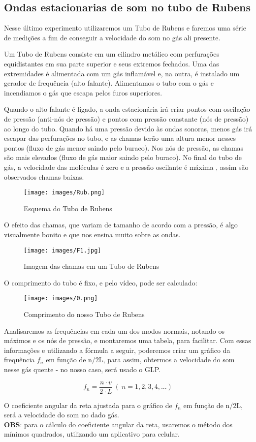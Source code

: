 \subsection{Ondas estacionarias de som no tubo de Rubens}

Nesse último experimento utilizaremos um Tubo de Rubens e faremos uma série de medições a fim de conseguir a velocidade do som no gás ali presente.

Um Tubo de Rubens consiste em um cilindro metálico com perfurações equidistantes em sua parte superior e seus extremos fechados. Uma das extremidades é alimentada com um gás inflamável e, na outra, é instalado um gerador de frequência (alto falante).
Alimentamos o tubo com o gás e incendiamos o gás que escapa pelos furos superiores. 

Quando o alto-falante é ligado, a onda estacionária irá criar pontos com oscilação de pressão (anti-nós de pressão) e pontos com pressão constante (nós de pressão) ao longo do tubo. Quando há uma pressão devido às ondas sonoras, menos gás irá escapar das perfurações no tubo, e as chamas terão uma altura menor nesses pontos (fluxo de gás menor saindo pelo buraco). Nos nós de pressão, as chamas são mais elevados (fluxo de gás maior saindo pelo buraco). No final do tubo de gás, a velocidade das moléculas é zero e a pressão oscilante é máxima , assim são observados chamas baixas.
\begin{figure}[H]
  \centering
  \texttt{[image: images/Rub.png]}
  \caption{Esquema do Tubo de Rubens}
\end{figure}    

O efeito das chamas, que variam de tamanho de acordo com a pressão, é algo visualmente bonito e que nos ensina muito sobre as ondas.

\begin{figure}[H]
  \centering
  \texttt{[image: images/F1.jpg]}
  \caption{Imagem das chamas em um Tubo de Rubens}
\end{figure}

O comprimento do tubo é fixo, e pelo vídeo, pode ser calculado:

\begin{figure}[H]
  \centering
  \texttt{[image: images/0.png]}
  \caption{Comprimento do nosso Tubo de Rubens}
\end{figure}

Analisaremos as frequências em cada um dos modos normais, notando os máximos e os nós de pressão, e montaremos uma tabela, para facilitar. Com essas informações e utilizando a fórmula a seguir, poderemos criar um gráfico da frequência $f_n$ em função de n/2L, para assim, obtermos a velocidade do som nesse gás quente - no nosso caso, será usado o GLP.

\[ f_n = \frac{n \cdot v}{2\cdot L}  \ (\ n = 1, 2, 3, 4, ...)  \]

O coeficiente angular da reta ajustada para o gráfico de $f_n$ em função de n/2L, será a velocidade do som no dado gás.\\

\textbf{OBS}: para o cálculo do coeficiente angular da reta, usaremos o método dos mínimos quadrados, utilizando um aplicativo para celular.
